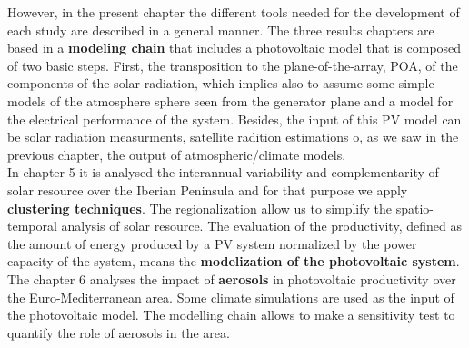 However, in the present chapter the different tools needed for the development of each study are described in a general manner. The three results chapters are based in a \textbf{modeling chain} that includes a photovoltaic model that is composed of two basic steps. First, the transposition to the plane-of-the-array, POA, of the components of the solar radiation, which implies also to assume some simple models of the atmosphere sphere seen from the generator plane and a model for the electrical performance of the system. Besides, the input of this PV model can be solar radiation measurments, satellite radition estimations o, as we saw in the previous chapter, the output of atmospheric/climate models. \\


  In chapter 5 it is analysed the interannual variability and complementarity of solar resource over the Iberian Peninsula and for that purpose we apply \textbf{clustering techniques}. The regionalization allow us to simplify the spatio-temporal analysis of solar resource. The evaluation of the productivity, defined as the amount of energy produced by a PV system normalized by the power capacity of the system, means the \textbf{modelization of the photovoltaic system}.\\
  
  The chapter 6 analyses the impact of \textbf{aerosols} in photovoltaic productivity over the Euro-Mediterranean area.  Some climate simulations are used as the input of the photovoltaic model. The modelling chain allows to make a sensitivity test to quantify the role of aerosols in the area.\\

